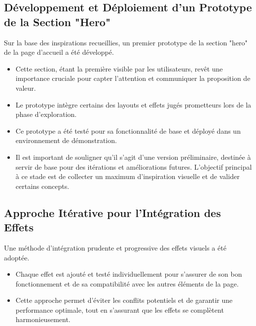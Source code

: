 \documentclass[12pt, a4paper]{article}
\begin{document}
\subsection{Développement et Déploiement d'un Prototype de la Section "Hero"}
Sur la base des inspirations recueillies, un premier prototype de la section "hero" de la page d'accueil a été développé.
\begin{itemize}
    \item Cette section, étant la première visible par les utilisateurs, revêt une importance cruciale pour capter l'attention et communiquer la proposition de valeur.
    \item Le prototype intègre certains des layouts et effets jugés prometteurs lors de la phase d'exploration.
    \item Ce prototype a été testé pour sa fonctionnalité de base et déployé dans un environnement de démonstration.
    \item Il est important de souligner qu'il s'agit d'une version préliminaire, destinée à servir de base pour des itérations et améliorations futures. L'objectif principal à ce stade est de collecter un maximum d'inspiration visuelle et de valider certains concepts.
\end{itemize}

\subsection{Approche Itérative pour l'Intégration des Effets}
Une méthode d'intégration prudente et progressive des effets visuels a été adoptée.
\begin{itemize}
    \item Chaque effet est ajouté et testé individuellement pour s'assurer de son bon fonctionnement et de sa compatibilité avec les autres éléments de la page.
    \item Cette approche permet d'éviter les conflits potentiels et de garantir une performance optimale, tout en s'assurant que les effets se complètent harmonieusement.
\end{itemize}
\end{document}
